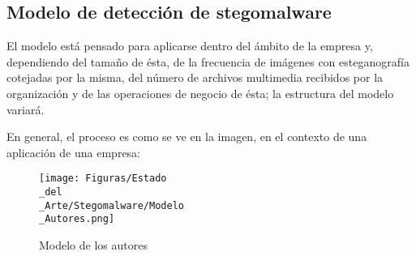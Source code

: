 \subsection{Modelo de detección de stegomalware}

El modelo está pensado para aplicarse dentro del ámbito de la empresa y, dependiendo del tamaño de ésta, de la frecuencia de imágenes con esteganografía cotejadas por la misma, del número de archivos multimedia recibidos por la organización y de las operaciones de negocio de ésta; la estructura del modelo variará.

En general, el proceso es como se ve en la imagen, en el contexto de una aplicación de una empresa:

\begin{figure}[H]
  \centering
  \texttt{[image: Figuras/Estado\\\_del\\\_Arte/Stegomalware/Modelo\\\_Autores.png]}
  \label{fig:modelo-autores}
  \caption{Modelo de los autores}
\end{figure}

